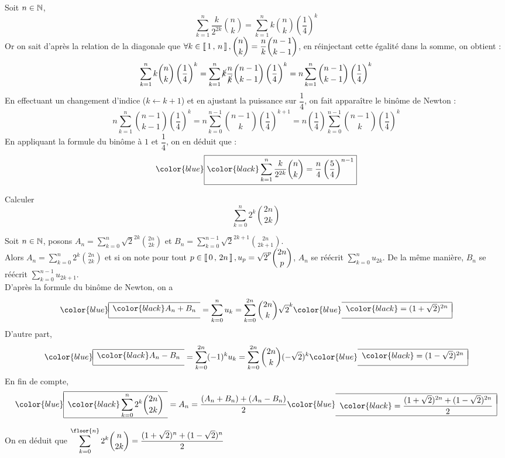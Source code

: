 \documentclass[mathmodern,openany,11pt]{livre}
\newcommand{\lboxed}[1]{{\color{blue}\begin{array}{|l}\hline\\[-2.4ex]{\color{black}#1}\\[1.2ex]\hline\end{array}}}
\newcommand{\rboxed}[1]{{\color{blue}\begin{array}{r|}\hline\\[-2.4ex]{\color{black}#1}\\[1.2ex]\hline\end{array}}}
\newcommand{\lrboxed}[1]{{\color{blue}\boxed{\color{black}#1}}}
\begin{document}
\begin{solution}
Soit $n \in \mathbb{N}$,
\[
\displaystyle\sum\limits_{k=1}^{n} \dfrac{k}{2^{2k}}\binom{n}{k} = \displaystyle\sum\limits_{k=1}^{n}k \binom{n}{k} \left(\dfrac{1}{4}\right)^k
\]
Or on sait d'après la relation de la diagonale que $\forall k \in \left\llbracket \, 1 \, , \, n \, \right\rrbracket, \displaystyle\binom{n}{k} = \dfrac{n}{k}\binom{n-1}{k-1}$, en réinjectant cette égalité dans la somme, on obtient :
\[
\displaystyle\sum\limits_{k=1}^{n}k \binom{n}{k} \left(\dfrac{1}{4}\right)^k
=\displaystyle\sum\limits_{k=1}^{n}\cancel{k} \dfrac{n}{\cancel{k}}\binom{n-1}{k-1} \left(\dfrac{1}{4}\right)^k
=n\displaystyle\sum\limits_{k=1}^{n} \binom{n-1}{k-1} \left(\dfrac{1}{4}\right)^k
\]
En effectuant un changement d'indice ($k \leftarrow k+1$) et en ajustant la puissance sur $\dfrac{1}{4}$, on fait apparaître le binôme de Newton :
\[
n\displaystyle\sum\limits_{k=1}^{n} \binom{n-1}{k-1} \left(\dfrac{1}{4}\right)^k 
= n\displaystyle\sum\limits_{k=0}^{n-1} \binom{n-1}{k} \left(\dfrac{1}{4}\right)^{k+1} =  n\left(\dfrac{1}{4}\right)\displaystyle\sum\limits_{k=0}^{n-1} \binom{n-1}{k} \left(\dfrac{1}{4}\right)^{k}
\]
En appliquant la formule du binôme à $1$ et $\dfrac{1}{4}$, on en déduit que :
\[
\lrboxed{\displaystyle\sum\limits_{k=1}^{n} \dfrac{k}{2^{2k}}\binom{n}{k} =\dfrac{n}{4}\left(\dfrac{5}{4}\right)^{n-1}}
\]
\end{solution}

\begin{exercice}
Calculer 
\[
\displaystyle\sum\limits_{k=0}^{n} 2^k \binom{2n}{2k}
\]
\end{exercice}

\begin{solution}
Soit $n \in \mathbb{N}$, posons $A_n = \displaystyle\sum\limits_{k=0}^{n} \sqrt{2}^{2k} \binom{2n}{2k}$ et $B_n = \displaystyle\sum\limits_{k=0}^{n-1} \sqrt{2}^{2k+1}  \binom{2n}{2k+1}$.\\
Alors $A_n = \displaystyle\sum\limits_{k=0}^{n} 2^k \binom{2n}{2k}$ et si on note pour tout $ p \in \left\llbracket \, 0 \, , \, 2n \, \right\rrbracket, u_p = \sqrt{2}^{p} \displaystyle\binom{2n}{p}$, $A_n$ se réécrit $\displaystyle\sum\limits_{k=0}^{n} u_{2k}$. De la même manière, $B_n$ se réécrit $\displaystyle\sum\limits_{k=0}^{n-1} u_{2k+1}$.\\
D'après la formule du binôme de Newton, on a
\[
\lboxed{A_n + B_n} 
= \displaystyle\sum\limits_{k=0}^{n} u_{k} 
= \displaystyle\sum\limits_{k=0}^{2n}\binom{2n}{k} \sqrt{2}^k 
\rboxed{= (1+\sqrt{2})^{2n}} 
\]
D'autre part,  
\[
\lboxed{A_n - B_n}
= \displaystyle\sum\limits_{k=0}^{2n} (-1)^k u_{k} 
= \displaystyle\sum\limits_{k=0}^{2n} \binom{2n}{k}  (-\sqrt{2})^k 
\rboxed{= (1-\sqrt{2})^{2n}}
\]
En fin de compte,  
\[
\lboxed{\displaystyle\sum\limits_{k=0}^{n} 2^k \binom{2n}{2k}}
= A_n 
= \dfrac{(A_n+B_n) + (A_n - B_n)}{2} 
\rboxed{= \dfrac{(1+\sqrt{2})^{2n}+(1-\sqrt{2})^{2n}}{2}}
\]

On en déduit que \hfil$\displaystyle\sum\limits_{k=0}^{\floor{n}} 2^k \binom{n}{2k} = \dfrac{(1+\sqrt{2})^{n}+(1-\sqrt{2})^{n}}{2}$
\end{solution}
\end{document}
